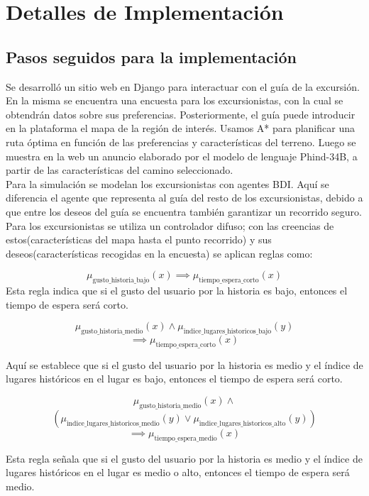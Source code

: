 \documentclass[10pt,twocolumn]{article}
\begin{document}
	\section{Detalles de Implementación}
	
	\subsection{Pasos seguidos para la implementación}
	Se desarrolló un sitio web en Django para interactuar con el guía de la excursión. En la misma se encuentra una encuesta para los excursionistas, con la cual se obtendrán datos sobre sus preferencias. Posteriormente, el guía puede introducir en la plataforma el mapa de la región de interés. Usamos A* para planificar una ruta óptima en función de las preferencias y características del terreno. Luego se muestra en la web un anuncio elaborado por el modelo de lenguaje Phind-34B, a partir de las características del camino seleccionado.\\
	Para la simulación se modelan los excursionistas con agentes BDI. Aquí se diferencia el agente que representa al guía del resto de los excursionistas, debido a que entre los deseos del guía se encuentra también garantizar un recorrido seguro. Para los excursionistas se utiliza un controlador difuso; con las creencias de estos(características del mapa hasta el punto recorrido) y sus deseos(características recogidas en la encuesta) se aplican reglas como:
	
	$$
	 \mu_{\text{gusto\_historia\_bajo}}(x) \implies \mu_{\text{tiempo\_espera\_corto}}(x)
	$$
	Esta regla indica que si el gusto del usuario por la historia es bajo, entonces el tiempo de espera será corto.
	
	$$
	\mu_{\text{gusto\_historia\_medio}}(x) \land \mu_{\text{indice\_lugares\_historicos\_bajo}}(y)$$
	$$\implies \mu_{\text{tiempo\_espera\_corto}}(x)$$
	
	
	Aquí se establece que si el gusto del usuario por la historia es medio y el índice de lugares históricos en el lugar es bajo, entonces el tiempo de espera será corto.
	
	$$
		\mu_{\text{gusto\_historia\_medio}}(x)  \land $$
		 $$ \left( \mu_{\text{indice\_lugares\_historicos\_medio}}(y)	
		 \lor \mu_{\text{indice\_lugares\_historicos\_alto}}(y) \right)$$
		$$\implies \mu_{\text{tiempo\_espera\_medio}}(x)$$

	Esta regla señala que si el gusto del usuario por la historia es medio y el índice de lugares históricos en el lugar es medio o alto, entonces el tiempo de espera será medio.
	
\end{document}
